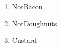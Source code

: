 \documentclass{article}
\begin{document}
\begin{enumerate}
\item NotBacon
\item NotDoughnuts
\item Custard
\end{enumerate}
\end{document}
